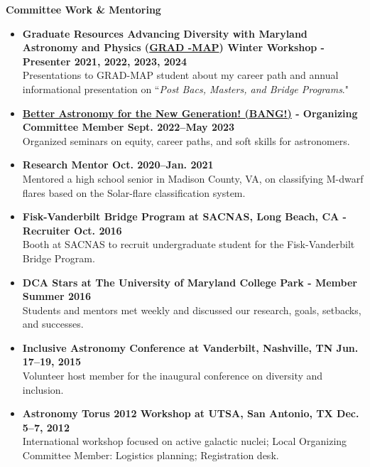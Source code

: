 \documentclass[letter,12pt]{article}
\begin{document}
\noindent
\vspace{-3mm}
{\bf Committee Work \& Mentoring} \\
\vspace{-13mm}
\begin{center}
\end{center}
\vspace{-3mm}
\begin{itemize}
    \item \textbf{Graduate Resources Advancing Diversity with Maryland Astronomy and Physics (\href{https://www.umdgradmap.org/}{GRAD -MAP}) Winter Workshop - Presenter \hfill 2021, 2022, 2023, 2024} \\
    Presentations to GRAD-MAP student about my career path and annual informational presentation on ``{\it Post Bacs, Masters, and Bridge Programs}."
    \item \textbf{\href{https://www.astro.umd.edu/events/colloquia/bang.html}{Better Astronomy for the New Generation! (BANG!)} - Organizing Committee Member \hfill Sept. 2022--May 2023} \\
    Organized seminars on equity, career paths, and soft skills for astronomers.
    \item \textbf{Research Mentor \hfill Oct. 2020--Jan. 2021} \\
    Mentored a high school senior in Madison County, VA, on classifying M-dwarf flares based on the Solar-flare classification system.
    \item \textbf{Fisk-Vanderbilt Bridge Program at SACNAS, Long Beach, CA - Recruiter \hfill Oct. 2016} \\
    Booth at SACNAS to recruit undergraduate student for the Fisk-Vanderbilt Bridge Program.
    \item \textbf{DCA Stars at The University of Maryland College Park - Member \hfill Summer 2016} \\
    Students and mentors met weekly and discussed our research, goals, setbacks, and successes.
    \item \textbf{Inclusive Astronomy Conference at Vanderbilt, Nashville, TN \hfill Jun. 17--19, 2015} \\
    Volunteer host member for the inaugural conference on diversity and inclusion.
    \item \textbf{Astronomy Torus 2012 Workshop at UTSA, San Antonio, TX \hfill Dec. 5--7, 2012} \\
    International workshop focused on active galactic nuclei; Local Organizing Committee Member: Logistics planning; Registration desk.
\end{itemize}
\end{document}
